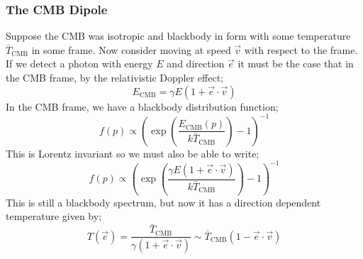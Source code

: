 \subsubsection{The CMB Dipole}
Suppose the CMB was isotropic and blackbody in form with some temperature $\bar{T}_{\text{CMB}}$ in some frame. Now consider moving at speed $\vec v$ with respect to the frame. If we detect a photon with energy $E$ and direction $\vec e$ it must be the case that in the CMB frame, by the relativistic Doppler effect;
\begin{equation}
E_{\text{CMB}} = \gamma E(1 + \vec{e} \cdot \vec{v})
\end{equation}
In the CMB frame, we have a blackbody distribution function;
\begin{equation}
f(p) \propto \left(\exp\left(\frac{E_{\text{CMB}}(p)}{k\bar{T}_{\text{CMB}}}\right) - 1\right)^{-1}
\end{equation}
This is Lorentz invariant so we must also be able to write;
\begin{equation}
f(p) \propto \left(\exp\left(\frac{\gamma E(1 + \vec{e}\cdot \vec{v})}{k\bar{T}_{\text{CMB}}}\right) - 1\right)^{-1}
\end{equation}
This is still a blackbody spectrum, but now it has a direction dependent temperature given by;\footnotemark
\begin{equation}
T(\vec e) = \frac{\bar{T}_{\text{CMB}}}{\gamma(1 + \vec{e}\cdot \vec{v})} \sim \bar{T}_{\text{CMB}}(1 - \vec{e}\cdot\vec{v})
\end{equation}
